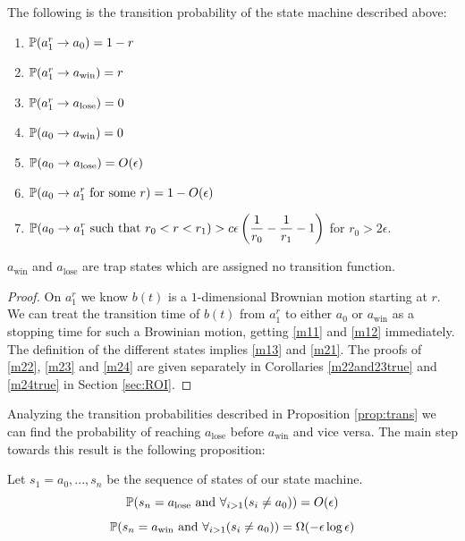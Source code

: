 {\begin{propos}\label{prop:trans}
The following is the transition probability of the state machine described above:
\begin{enumerate}
\item\label{m11} $\P(a^r_1\rightarrow a_0)=1-r$
\item\label{m12} $\P(a^r_1\rightarrow a_\text{win})=r$
\item\label{m13} $\P(a^r_1\rightarrow a_\text{lose})=0$
\item\label{m21} $\P(a_0\rightarrow a_\text{win})=0$
\item\label{m22} $\P(a_0\rightarrow a_\text{lose})=O(\epsilon)$
\item\label{m23} $\P(a_0\rightarrow a^r_1 \text{ for some }r)=1-O(\epsilon)$
\item\label{m24} $\P(a_0\rightarrow a^r_1 \text{ such that } r_0<r<r_1)>\ds c\epsilon\left(\frac 1 {r_0}-\frac 1 {r_1}-1\right)$ for $r_0>2\epsilon$.
\end{enumerate}
$a_\text{win}$ and $a_\text{lose}$ are trap states which are assigned no transition function.
\end{propos}

\begin{proof}
 On $a^r_1$ we know $b(t)$ is a $1$-dimensional Brownian motion starting at $r$.
 We can treat the transition time of $b(t)$ from $a^r_1$ to either $a_0$ or
 $a_\text{win}$ as a stopping time for such a Browinian motion, getting
 \ref{m11} and \ref{m12} immediately. The definition of the different states
 implies \ref{m13} and \ref{m21}. The proofs of \ref{m22}, \ref{m23} and \ref{m24}
 are given separately in Corollaries \ref{m22and23true} and \ref{m24true} in Section \ref{sec:ROI}.
\end{proof}

Analyzing the transition probabilities described in Proposition \ref{prop:trans} we
can find the probability of reaching $a_\text{lose}$ before $a_\text{win}$ and vice versa.
 The main step towards this result is the following proposition:

\begin{propos}\label{prop:winlose1}
Let $s_1=a_0,...,s_n$ be the sequence of states of our state machine.
\begin{equation}\label{eq:losecase}
\P(s_n=a_\text{lose} \text{ and } \ds\forall_{i>1}(s_i\neq a_0))=O(\epsilon)
\end{equation}
\begin{equation}\label{eq:wincase}
\P(s_n=a_\text{win} \text{ and } \ds\forall_{i>1}(s_i\neq a_0))=\Omega(-\epsilon\log\epsilon)
\end{equation}
\end{propos}

}
